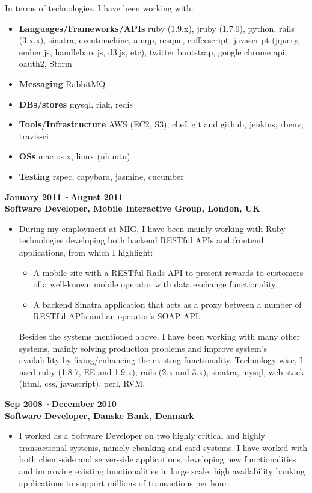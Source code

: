 \documentclass{res}
\def\Minus{\texttt{-}\,}
\begin{document}
\begin{resume}
\begin{itemize}
      In terms of technologies, I have been working with:
      \begin{itemize}
        \item[] {\bf Languages/Frameworks/APIs} ruby (1.9.x), jruby (1.7.0), python, rails (3.x.x), sinatra, eventmachine, amqp, resque, coffeescript, javascript (jquery, ember.js, handlebars.js, d3.js, etc), twitter bootstrap, google chrome api, oauth2, Storm
        \item[] {\bf Messaging} RabbitMQ
        \item[] {\bf DBs/stores} mysql, riak, redis
        \item[] {\bf Tools/Infrastructure} AWS (EC2, S3), chef, git and github, jenkins, rbenv, travis-ci
        \item[] {\bf OSs} mac os x, linux (ubuntu)
        \item[] {\bf Testing} rspec, capybara, jasmine, cucumber
      \end{itemize}

      \end{itemize}
  {\bf January 2011 \Minus August 2011}\\
  {\bf Software Developer, Mobile Interactive Group, London, UK}
       \begin{itemize}
        \item[] During my employment at MIG, I have been mainly working with Ruby technologies developing both backend RESTful APIs and frontend applications, from which I highlight:
          \begin{itemize}
          \item A mobile site with a RESTful Rails API to present rewards to customers of a well-known mobile operator with data exchange functionality;
          \item A backend Sinatra application that acts as a proxy between a number of RESTful APIs and an operator’s SOAP API.
          \end{itemize}

        Besides the systems mentioned above, I have been working with many other systems, mainly solving production problems and improve system’s availability by fixing/enhancing the existing functionality. Technology wise, I used ruby (1.8.7, EE and 1.9.x), rails (2.x and 3.x), sinatra, mysql, web stack (html, css, javascript), perl, RVM.
    \end{itemize}

  {\bf Sep 2008 \Minus December 2010}\\
  {\bf Software Developer, Danske Bank, Denmark}
        \begin{itemize}
        \item[] I worked as a Software Developer on two highly critical and highly transactional systems, namely ebanking and card systems. I have worked with both client-side and server-side applications, developing new functionalities and improving existing functionalities in large scale, high availability banking applications to support millions of transactions per hour.


\end{itemize}
\end{resume}
\end{document}
